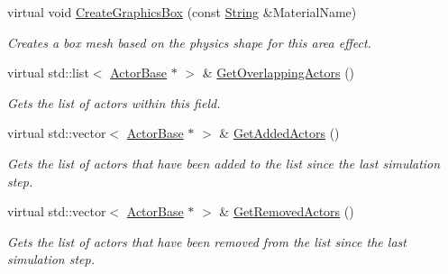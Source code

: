 \begin{DoxyCompactItemize}
virtual void \hyperlink{classphys_1_1AreaEffect_a169a8cba1c9aec84573788dff001fb31}{CreateGraphicsBox} (const \hyperlink{namespacephys_aa03900411993de7fbfec4789bc1d392e}{String} \&MaterialName)
\begin{DoxyCompactList}\small\item\em Creates a box mesh based on the physics shape for this area effect. \item\end{DoxyCompactList}\item 
virtual std::list$<$ \hyperlink{classphys_1_1ActorBase}{ActorBase} $\ast$ $>$ \& \hyperlink{classphys_1_1AreaEffect_ab995fec11d9e5fbae1851109067958db}{GetOverlappingActors} ()
\begin{DoxyCompactList}\small\item\em Gets the list of actors within this field. \item\end{DoxyCompactList}\item 
virtual std::vector$<$ \hyperlink{classphys_1_1ActorBase}{ActorBase} $\ast$ $>$ \& \hyperlink{classphys_1_1AreaEffect_a72a9673c926ce876df630c4aecfc09f6}{GetAddedActors} ()
\begin{DoxyCompactList}\small\item\em Gets the list of actors that have been added to the list since the last simulation step. \item\end{DoxyCompactList}\item 
virtual std::vector$<$ \hyperlink{classphys_1_1ActorBase}{ActorBase} $\ast$ $>$ \& \hyperlink{classphys_1_1AreaEffect_a021763db69e977a3a19ad7cc39df073b}{GetRemovedActors} ()
\begin{DoxyCompactList}\small\item\em Gets the list of actors that have been removed from the list since the last simulation step. \item\end{DoxyCompactList}\end{DoxyCompactItemize}
